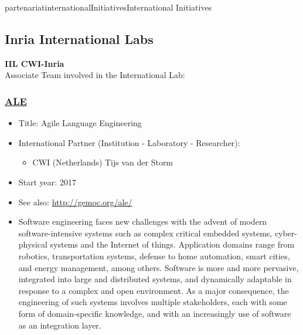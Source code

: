 \documentclass{ra2018}
\begin{document}
\begin{module}{partenariat}{internationalInitiatives}{International Initiatives}

\subsection{Inria International Labs}


\textbf{IIL CWI-Inria} \\   
 Associate Team involved in the International Lab: \\  
 \subsubsection{\href{http://gemoc.org/ale/}{ALE }}
\begin{itemize}
 \item Title: Agile Language Engineering
 \item International Partner (Institution -  Laboratory - Researcher):
 \begin{itemize}
    \item CWI (Netherlands)   Tijs van der Storm
 \end{itemize}
 \item Start year: 2017 \item See also: \url{http://gemoc.org/ale/}
 \item Software engineering faces new challenges with the advent of modern software-intensive systems such as complex critical embedded systems, cyber-physical systems and the Internet of things. Application domains range from robotics, transportation systems, defense to home automation, smart cities, and energy management, among others. Software is more and more pervasive, integrated into large and distributed systems, and dynamically adaptable in response to a complex and open environment. As a major consequence, the engineering of such systems involves multiple stakeholders, each with some form of domain-specific knowledge, and with an increasingly use of software as an integration layer.


\end{itemize}
\end{module}
\end{document}
